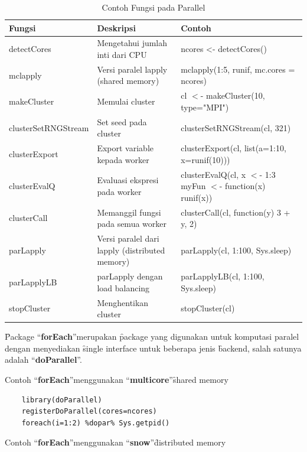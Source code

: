 \begin{table}
\caption{Contoh Fungsi pada Parallel \cite{r.schwendinger}}
\label{tab:contoh_fungsi}
\begin{tabular}{|L{4cm}|L{5cm}|L{5cm}|}
 \hline Fungsi & Deskripsi & Contoh \\ 
\hline detectCores​ & Mengetahui jumlah inti dari CPU & ncores <- detectCores()​ \\ 
\hline mclapply & Versi paralel lapply (shared memory) & mclapply(1:5, runif, mc.cores = ncores)​ \\ 
\hline makeCluster & Memulai cluster & cl $<$- makeCluster(10, type="MPI")​ \\ 
\hline clusterSetRNGStream & Set seed pada cluster​ & clusterSetRNGStream(cl, 321)​ \\ 
\hline clusterExport & Export variable kepada worker & clusterExport(cl, list(a=1:10, x=runif(10)))​ \\ 
\hline clusterEvalQ & Evaluasi ekspresi pada worker & clusterEvalQ(cl, {x $<$- 1:3​
myFun $<$- function(x) runif(x)}) \\ 
\hline clusterCall & Memanggil fungsi pada semua worker & clusterCall(cl, function(y) 3 + y, 2)​ \\ 
\hline parLapply & Versi paralel dari lapply (distributed memory) & parLapply(cl, 1:100, Sys.sleep)​ \\ 
\hline parLapplyLB & parLapply dengan load balancing & parLapplyLB(cl, 1:100, Sys.sleep)​ \\ 
\hline stopCluster & Menghentikan cluster & stopCluster(cl) \\ 
\hline 
\end{tabular} 
\end{table}

\f{Package} \textquotedblleft \textbf{forEach}\textquotedblright\space merupakan \f{package} yang digunakan untuk komputasi paralel dengan menyediakan \f{single interface} untuk beberapa jenis \f{backend}, salah satunya adalah \textquotedblleft \textbf{doParallel}\textquotedblright.

Contoh \textquotedblleft \textbf{forEach}\textquotedblright\space menggunakan \textquotedblleft \textbf{multicore}\textquotedblright\space \f{shared memory}

\begin{lstlisting}
	library(doParallel)​
	registerDoParallel(cores=ncores)​
	foreach(i=1:2) %dopar% Sys.getpid()​
\end{lstlisting}

Contoh \textquotedblleft \textbf{forEach}\textquotedblright\space menggunakan \textquotedblleft \textbf{snow}\textquotedblright\space \f{distributed memory}


